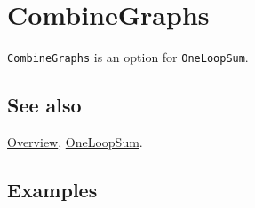 \documentclass[../FeynCalcManual.tex]{subfiles}
\begin{document}
\hypertarget{combinegraphs}{%
\section{CombineGraphs}\label{combinegraphs}}

\texttt{CombineGraphs} is an option for \texttt{OneLoopSum}.

\subsection{See also}

\hyperlink{toc}{Overview}, \hyperlink{oneloopsum}{OneLoopSum}.

\subsection{Examples}
\end{document}
